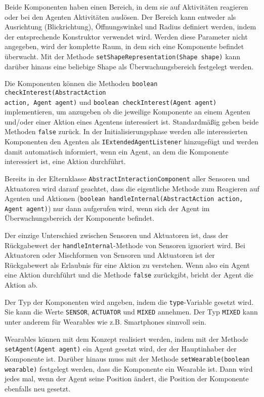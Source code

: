 Beide Komponenten haben einen Bereich, in dem sie auf Aktivitäten reagieren oder bei den Agenten Aktivitäten auslösen. Der Bereich kann entweder als Ausrichtung (Blickrichtung), Öffnungswinkel und Radius definiert werden, indem der entsprechende Konstruktor verwendet wird. Werden diese Parameter nicht angegeben, wird der komplette Raum, in dem sich eine Komponente befindet überwacht. Mit der Methode \texttt{setShapeRepresentation(Shape shape)} kann darüber hinaus eine beliebige Shape als Überwachungsbereich festgelegt werden.

Die Komponenten können die Methoden \texttt{boolean checkInterest\-(AbstractAction\\
action, Agent agent)} und \texttt{boolean checkInterest(Agent agent)} implementieren, um anzugeben ob die jeweilige Komponente an einem Agenten und/oder einer Aktion eines Agentens interessiert ist. Standardmäßig geben beide Methoden \texttt{false} zurück. In der Initialisierungsphase werden alle interessierten Komponenten den Agenten als \texttt{IExtendedAgentListener} hinzugefügt und werden damit automatisch informiert, wenn ein Agent, an dem die Komponente interessiert ist, eine Aktion durchführt.

 Bereits in der Elternklasse \texttt{AbstractInteractionComponent} aller Sensoren und Aktuatoren wird darauf geachtet, dass die eigentliche Methode zum Reagieren auf Agenten und Aktionen (\texttt{boolean handleInternal(AbstractAction action, Agent agent)}) nur dann aufgerufen wird, wenn sich der Agent im Überwachungsbereich der Komponente befindet.

Der einzige Unterschied zwischen Sensoren und Aktuatoren ist, dass der Rückgabewert der \texttt{handle\-Internal}-Methode von Sensoren ignoriert wird. Bei Aktuatoren oder Mischformen von Sensoren und Aktuatoren ist der Rückgabewert als Erlaubnis für eine Aktion zu verstehen. Wenn also ein Agent eine Aktion durchführt und die Methode \texttt{false} zurückgibt, bricht der Agent die Aktion ab.

Der Typ der Komponenten wird angeben, indem die \texttt{type}-Variable gesetzt wird. Sie kann die Werte \texttt{SENSOR}, \texttt{ACTUATOR} und \texttt{MIXED} annehmen. Der Typ \texttt{MIXED} kann unter anderem für Wearables wie z.B. Smartphones sinnvoll sein.

Wearables können mit dem Konzept realisiert werden, indem mit der Methode \texttt{setAgent(Agent agent)} ein Agent gesetzt wird, der der Hauptinhaber der Komponente ist. Darüber hinaus muss mit der Methode \texttt{setWearable(boolean wearable)} festgelegt werden, dass die Komponente ein Wearable ist. Dann wird jedes mal, wenn der Agent seine Position ändert, die Position der Komponente ebenfalls neu gesetzt.
